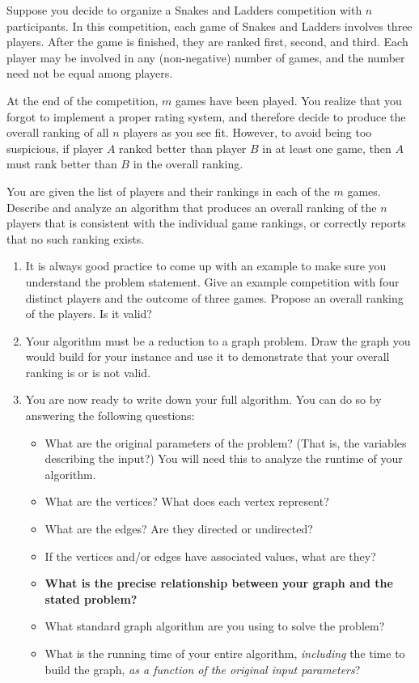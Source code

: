 \documentclass[11pt]{article}
\begin{document}
\noindent 
Suppose you decide to organize a Snakes and Ladders competition with $n$
participants. In this competition, each game of Snakes and Ladders involves
three players. After the game is finished, they are ranked first, second, and
third.  Each player may be involved in any (non-negative) number of games, and
the number need not be equal among players.

At the end of the competition, $m$ games have been played.  You realize that you
forgot to implement a proper rating system, and therefore decide to produce the
overall ranking of all $n$ players as you see fit.  However, to avoid being too
suspicious, if player $A$ ranked better than player $B$ in at least one game,
then $A$ must rank better than $B$ in the overall ranking.

You are given the list of players and their rankings in each of the $m$ games.
Describe and analyze an algorithm that produces an overall ranking of the $n$
players that is consistent with the individual game rankings, or correctly
reports that no such ranking exists.

\begin{enumerate}
    \item It is always good practice to come up with an example to make sure you
    understand the problem statement. Give an example competition with four
    distinct players and the outcome of three games. Propose an overall ranking of the players.
    Is it valid?
    \vspace{3in}
    \item Your algorithm must be a reduction to a graph problem. Draw the graph
    you would build for your instance and use it to demonstrate that your overall ranking
    is or is not valid.

    \vspace{2in}
    \item You are now ready to write down your full algorithm. You can do so by answering the following questions:
\begin{itemize}\itemsep40pt
\item What are the original parameters of the problem? (That is, the variables
describing the input?) You will need this to analyze the runtime of your
algorithm.
\item What are the vertices?  What does each vertex represent?
\item What are the edges?  Are they directed or undirected?
\item If the vertices and/or edges have associated values, what are they?
\item \textbf{What is the precise relationship between your graph and the stated problem?}
\item What standard graph algorithm are you using to solve the problem?
\item What is the running time of your entire algorithm, \emph{including} the time to build the graph, \emph{as a function of the original input parameters}?
\end{itemize}
\end{enumerate}


\end{document}

